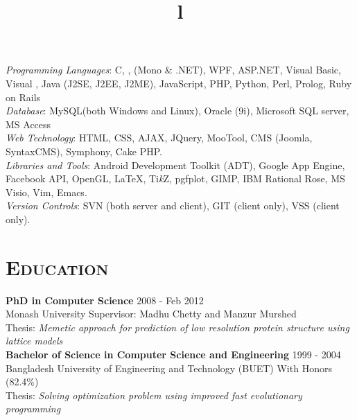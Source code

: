\begin{resume}
\emph{Programming Languages}: C, \Cplusplus, \CSharp (Mono \& .NET),  WPF,   ASP.NET,  Visual Basic, Visual \Cplusplus,  Java (J2SE, J2EE, J2ME), JavaScript, PHP, Python, Perl, Prolog, Ruby on Rails\\[3pt]
\emph{Database}:  MySQL(both Windows and Linux), Oracle (9i), Microsoft SQL server, MS Access\\[3pt]
\emph{Web Technology}: HTML, CSS, AJAX, JQuery, MooTool, CMS (Joomla, SyntaxCMS), Symphony, Cake PHP.\\[3pt]
\emph{Libraries and Tools}: Android Development Toolkit (ADT), Google App Engine, Facebook API, OpenGL, \LaTeX, Ti{\textit k}Z, pgfplot, GIMP, IBM Rational Rose, MS Visio, Vim, Emacs.\\[3pt]
\emph{Version Controls}: SVN (both server and client), GIT (client only), VSS (client only).  

\section{\textsc{Education}}

\textbf{PhD in Computer Science} \hfill 2008 - Feb 2012 \\
Monash University \hfill Supervisor: Madhu Chetty and Manzur Murshed\\
Thesis: {\it Memetic approach for prediction of low resolution protein structure using lattice models}
\\[3pt]
\textbf{Bachelor of Science in Computer Science and Engineering} \hfill 1999 - 2004 \\ 
Bangladesh University of Engineering and Technology (BUET) \hfill With Honors (82.4\%)\\
Thesis: {\it Solving optimization problem using improved fast evolutionary programming}
\newline

\vspace*{-.5cm}
\begin{formatb}
  \title{l}\\
  \\
  \body\\
\end{formatb}


\end{resume}
